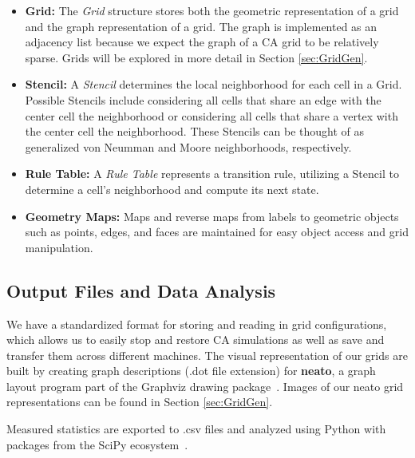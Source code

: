 \documentclass[a4paper,11pt]{report}
\begin{document}
\begin{itemize}

\item \textbf{Grid:} The \textit{Grid} structure stores both the geometric representation of a grid and the graph representation of a grid. The graph is implemented as an adjacency list because we expect the graph of a CA grid to be relatively sparse. Grids will be explored in more detail in Section \ref{sec:GridGen}.

\item \textbf{Stencil:} A \textit{Stencil} determines the local neighborhood for each cell in a Grid. Possible Stencils include considering all cells that share an edge with the center cell the neighborhood or considering all cells that share a vertex with the center cell the neighborhood. These Stencils can be thought of as generalized von Neumman and Moore neighborhoods, respectively.

\item \textbf{Rule Table:} A \textit{Rule Table} represents a transition rule, utilizing a Stencil to determine a cell's neighborhood and compute its next state.

\item \textbf{Geometry Maps:} Maps and reverse maps from labels to geometric objects such as points, edges, and faces are maintained for easy object access and grid manipulation.

\end{itemize}


\subsection{Output Files and Data Analysis}

We have a standardized format for storing and reading in grid configurations, which allows us to easily stop and restore CA simulations as well as save and transfer them across different machines. The visual representation of our grids are built by creating graph descriptions (.dot file extension) for \textbf{neato}, a graph layout program part of the Graphviz drawing package~\cite{el01}. Images of our neato grid representations can be found in Section \ref{sec:GridGen}.

Measured statistics are exported to .csv files and analyzed using Python with packages from the SciPy ecosystem~\cite{jo14}.
\end{document}
